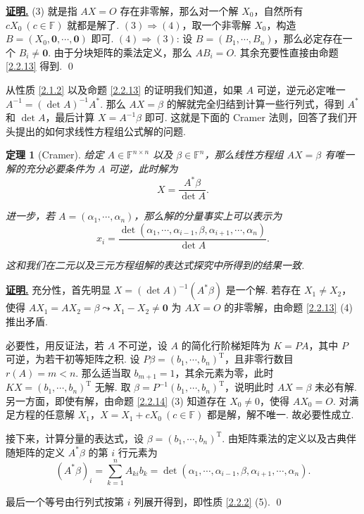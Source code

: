 \documentclass[10pt,openany]{article}
\theoremstyle{thmstyle} %
\newtheorem{theorem}{定理}[subsection]
\theoremstyle{defstyle} %
\theoremstyle{prostyle} %
\theoremstyle{exastyle}
\theoremstyle{remstyle}
\renewenvironment{proof}[1][证明]{\par\underline{\textbf{#1.}} \;\fangsong}{\qed\par}
\newcommand{\T}{^{\text{T}}}
\newcommand{\F}{\mathbb{F}}
\newcommand{\n}{^{n \times n}}
\begin{document}
\begin{proof}
	(3) 就是指 \( AX=O \) 存在非零解，那么对一个解 \( X_0 \)，自然所有 \( cX_0 \ (c \in \F) \) 就都是解了. \( (3) \Rightarrow (4) \)，取一个非零解 \( X_0 \)，构造 \( B=(X_0,\bm{0},\cdots,\bm{0}) \) 即可. \( (4) \Rightarrow (3) \): 设 \( B=(B_1,\cdots,B_n) \)，那么必定存在一个 \( B_i \neq \bm{0} \). 由于分块矩阵的乘法定义，那么 \( AB_i=O \). 其余充要性直接由命题 \ref{2.2.13} 得到.
\end{proof}

从性质 \ref{2.1.2} 以及命题 \ref{2.2.13} 的证明我们知道，如果 \( A \) 可逆，逆元必定唯一 \( A^{-1}=(\det A)^{-1} A^* \). 那么 \( AX=\beta \) 的解就完全归结到计算一些行列式，得到 \( A^* \) 和 \( \det A \)，最后计算 \( X=A^{-1}\beta \) 即可. 这就是下面的 Cramer 法则，回答了我们开头提出的如何求线性方程组公式解的问题.

\begin{theorem}[Cramer]\label{2.2.15}
	给定 \( A \in \F\n \) 以及 \( \beta \in \F^n \)，那么线性方程组 \( AX=\beta \) 有唯一解的充分必要条件为 \( A \) 可逆，此时解为
	\[ X=\frac{A^*\beta}{\det A}. \]
	
	进一步，若 \( A=(\alpha_1,\cdots,\alpha_n) \)，那么解的分量事实上可以表示为
	\[ x_i=\frac{\det(\alpha_1,\cdots,\alpha_{i-1},\beta,\alpha_{i+1},\cdots,\alpha_n)}{\det A}. \]
	
	这和我们在二元以及三元方程组解的表达式探究中所得到的结果一致.
	
\end{theorem}

\begin{proof}
	充分性，首先明显 \( X=(\det A)^{-1}(A^*\beta) \) 是一个解. 若存在 \( X_1 \neq X_2 \)，使得 \( AX_1=AX_2=\beta \leadsto X_1-X_2 \neq \bm{0} \) 为 \( AX=O \) 的非零解，由命题 \ref{2.2.13} (4) 推出矛盾. 
	
	必要性，用反证法，若 \( A \) 不可逆，设 \( A \) 的简化行阶梯矩阵为 \( K=PA \)，其中 \( P \) 可逆，为若干初等矩阵之积. 设 \( P\beta=(b_1,\cdots,b_n)\T \)，且非零行数目 \( r(A)=m<n \). 那么适当取 \( b_{m+1}=1 \)，其余元素为零，此时 \( KX=(b_1,\cdots,b_n)\T \) 无解. 取 \( \beta=P^{-1}(b_1,\cdots,b_n)\T \)，说明此时 \( AX=\beta \) 未必有解. 另一方面，即使有解，由命题 \ref{2.2.14} (3) 知道存在 \( X_0 \neq 0 \)，使得 \( AX_0=O \). 对满足方程的任意解 \( X_1 \)，\( X=X_1+cX_0 \ (c \in \F) \) 都是解，解不唯一. 故必要性成立.
	
	接下来，计算分量的表达式，设 \( \beta=(b_1,\cdots,b_n)\T \). 由矩阵乘法的定义以及古典伴随矩阵的定义 \( A^*\beta \) 的第 \( i \) 行元素为
	\[ (A^*\beta)_i=\sum_{k=1}^{n} A_{ki}b_k=\det(\alpha_1,\cdots,\alpha_{i-1},\beta,\alpha_{i+1},\cdots,\alpha_n). \]
	
	最后一个等号由行列式按第 \( i \) 列展开得到，即性质 \ref{2.2.2} (5).
\end{proof}
\end{document}

